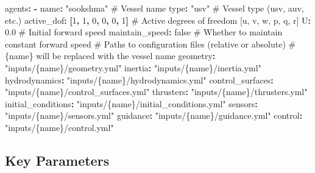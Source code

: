 \documentclass[
  letterpaper,
  DIV=11,
  numbers=noendperiod]{scrreprt}
\newenvironment{Shaded}{\begin{snugshade}}{\end{snugshade}}
\newcommand{\AttributeTok}[1]{\textcolor[rgb]{0.40,0.45,0.13}{#1}}
\newcommand{\CharTok}[1]{\textcolor[rgb]{0.13,0.47,0.30}{#1}}
\newcommand{\CommentTok}[1]{\textcolor[rgb]{0.37,0.37,0.37}{#1}}
\newcommand{\DecValTok}[1]{\textcolor[rgb]{0.68,0.00,0.00}{#1}}
\newcommand{\FloatTok}[1]{\textcolor[rgb]{0.68,0.00,0.00}{#1}}
\newcommand{\FunctionTok}[1]{\textcolor[rgb]{0.28,0.35,0.67}{#1}}
\newcommand{\KeywordTok}[1]{\textcolor[rgb]{0.00,0.23,0.31}{\textbf{#1}}}
\newcommand{\StringTok}[1]{\textcolor[rgb]{0.13,0.47,0.30}{#1}}
\begin{document}
\begin{Shaded}
\begin{Highlighting}[]
\FunctionTok{agents}\KeywordTok{:}
\AttributeTok{  }\KeywordTok{{-}}\AttributeTok{ }\FunctionTok{name}\KeywordTok{:}\AttributeTok{ }\StringTok{"sookshma"}\CommentTok{          \# Vessel name}
\AttributeTok{    }\FunctionTok{type}\KeywordTok{:}\AttributeTok{ }\StringTok{"usv"}\CommentTok{               \# Vessel type (usv, auv, etc.)}
\AttributeTok{    }\FunctionTok{active\_dof}\KeywordTok{:}\AttributeTok{ }\KeywordTok{[}\DecValTok{1}\KeywordTok{,}\AttributeTok{ }\DecValTok{1}\KeywordTok{,}\AttributeTok{ }\DecValTok{0}\KeywordTok{,}\AttributeTok{ }\DecValTok{0}\KeywordTok{,}\AttributeTok{ }\DecValTok{0}\KeywordTok{,}\AttributeTok{ }\DecValTok{1}\KeywordTok{]}\CommentTok{  \# Active degrees of freedom [u, v, w, p, q, r]}
\AttributeTok{    }\FunctionTok{U}\KeywordTok{:}\AttributeTok{ }\FloatTok{0.0}\CommentTok{                    \# Initial forward speed}
\AttributeTok{    }\FunctionTok{maintain\_speed}\KeywordTok{:}\AttributeTok{ }\CharTok{false}\CommentTok{     \# Whether to maintain constant forward speed}
\AttributeTok{    }
\CommentTok{    \# Paths to configuration files (relative or absolute)}
\CommentTok{    \# \{name\} will be replaced with the vessel name}
\AttributeTok{    }\FunctionTok{geometry}\KeywordTok{:}\AttributeTok{ }\StringTok{"inputs/\{name\}/geometry.yml"}
\AttributeTok{    }\FunctionTok{inertia}\KeywordTok{:}\AttributeTok{ }\StringTok{"inputs/\{name\}/inertia.yml"}
\AttributeTok{    }\FunctionTok{hydrodynamics}\KeywordTok{:}\AttributeTok{ }\StringTok{"inputs/\{name\}/hydrodynamics.yml"}
\AttributeTok{    }\FunctionTok{control\_surfaces}\KeywordTok{:}\AttributeTok{ }\StringTok{"inputs/\{name\}/control\_surfaces.yml"}
\AttributeTok{    }\FunctionTok{thrusters}\KeywordTok{:}\AttributeTok{ }\StringTok{"inputs/\{name\}/thrusters.yml"}
\AttributeTok{    }\FunctionTok{initial\_conditions}\KeywordTok{:}\AttributeTok{ }\StringTok{"inputs/\{name\}/initial\_conditions.yml"}
\AttributeTok{    }\FunctionTok{sensors}\KeywordTok{:}\AttributeTok{ }\StringTok{"inputs/\{name\}/sensors.yml"}
\AttributeTok{    }\FunctionTok{guidance}\KeywordTok{:}\AttributeTok{ }\StringTok{"inputs/\{name\}/guidance.yml"}
\AttributeTok{    }\FunctionTok{control}\KeywordTok{:}\AttributeTok{ }\StringTok{"inputs/\{name\}/control.yml"}
\end{Highlighting}
\end{Shaded}

\subsection*{Key Parameters}\label{key-parameters}
\end{document}

